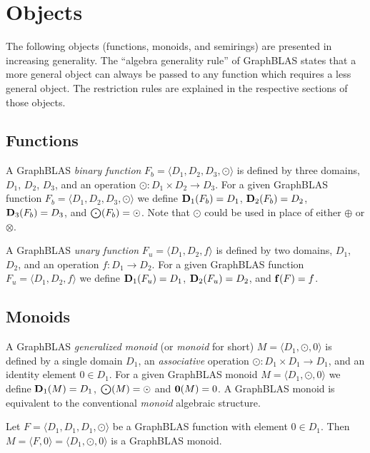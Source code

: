 \chapter{Objects}

The following objects (functions, monoids, and semirings) are presented in increasing generality.
The ``algebra generality rule'' of GraphBLAS states that a more general object can always be passed to
any function which requires a less general object. The restriction rules are explained in the respective sections of those objects.

\section{Functions}

A GraphBLAS \emph{binary function} $F_b = \langle D_1, D_2, D_3, \odot \rangle$
is defined by three domains, $D_1$, $D_2$, $D_3$, and an operation
$\odot: D_1 \times D_2 \rightarrow D_3$.  For a given GraphBLAS function
$F_b=\langle D_1, D_2, D_3,\odot \rangle$ we define $\bold{D}_1(F_b) = D_1$,
$\bold{D}_2(F_b) = D_2$, $\bold{D}_3(F_b) = D_3$, and $\bold{\bigodot}(F_b)
= \odot$.  Note that $\odot$ could be used in place of either $\oplus$ or $\otimes$.

A GraphBLAS \emph{unary function} $F_u = \langle D_1, D_2, f\rangle$
is defined by two domains, $D_1$, $D_2$, and an operation
$f: D_1 \rightarrow D_2$.  For a given GraphBLAS function
$F_u=\langle D_1, D_2, f \rangle$ we define $\bold{D}_1(F_u) = D_1$,
$\bold{D}_2(F_u) = D_2$, and $\bold{f}(F)
= f$.

\section{Monoids}

A GraphBLAS \emph{generalized monoid} (or \emph{monoid} for short) $M =
\langle D_1,\odot,0 \rangle$ is defined by a single domain $D_1$, an 
\emph{associative} operation $\odot: D_1 \times D_1 \rightarrow D_1$,
and an identity element $0 \in D_1$.  For a given GraphBLAS monoid $M=\langle
D_1,\odot,0 \rangle$ we define $\bold{D}_1(M) = D_1$, $\bold{\bigodot}(M) =
\odot$ and $\bold{0}(M) = 0$.  A GraphBLAS monoid is equivalent to 
the conventional \emph{monoid} algebraic structure.

Let $F = \langle D_1,D_1,D_1,\odot \rangle$ be a GraphBLAS function
with element $0 \in D_1$.  Then $M = \langle F,0 \rangle = \langle
D_1,\odot,0 \rangle$ is a GraphBLAS monoid.

